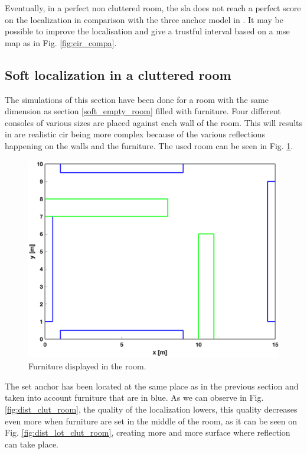 Eventually, in a perfect non cluttered room, the \gls{sla} does not reach a perfect score on the localization in comparison with the three anchor model in \cite{hannotier2019indoor}. It may be possible to improve the localisation and give a trustful interval based on a \gls{mse} map as in Fig. \ref{fig:cir_compa}.

\subsection{Soft localization in a cluttered room}
\label{simu_soft_clut}
The simulations of this section have been done for a room with the same dimension as section \ref{soft_empty_room} filled with furniture. Four different consoles of various sizes are placed against each wall of the room. This will results in are realistic \gls{cir} being more complex because of the various reflections happening on the walls and the furniture. The used room can be seen in Fig. \ref{fig:room_cluttered}.

\begin{figure}[H]
\centering
\includegraphics[width=.6\linewidth]{Images/room_furniture.png}
\caption{Furniture displayed in the room. \label{fig:room_cluttered}}
\end{figure}


The set anchor has been located at the same place as in the previous section and taken into account furniture that are in blue. As we can observe in Fig. \ref{fig:dist_clut_room}, the quality of the localization lowers, this quality decreases even more when furniture are set in the middle of the room, as it can be seen on Fig. \ref{fig:dist_lot_clut_room}, creating more and more surface where reflection can take place.

